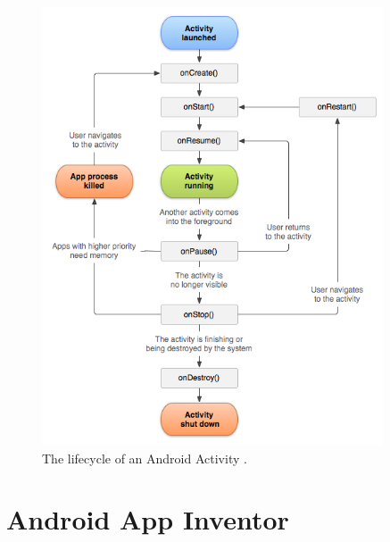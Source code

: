 \begin{figure}[h!]
\centering
\includegraphics[width=0.9\textwidth]{images/chap4_activity_lifecycle.png}
\caption{The lifecycle of an Android Activity \cite{AndroidActivity}.}
\label{fig:activity_lifecycle}
\end{figure}

\section{Android App Inventor}

